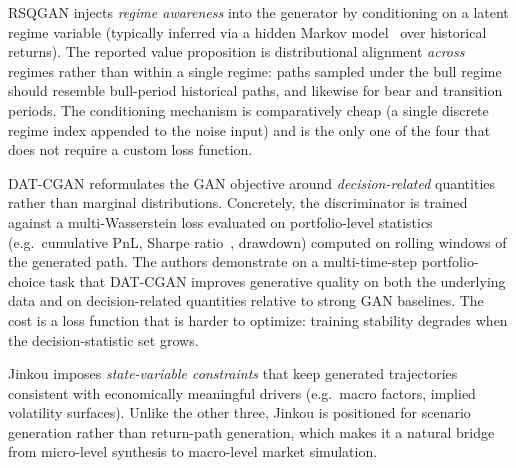 \documentclass[11pt,a4paper]{article}
\begin{document}
RSQGAN \citep{RSQGAN} injects \emph{regime awareness} into the generator by conditioning on a latent regime variable (typically inferred via a hidden Markov model~\citep{rabiner1989tutorial,hamilton1989new} over historical returns). The reported value proposition is distributional alignment \emph{across} regimes rather than within a single regime: paths sampled under the bull regime should resemble bull-period historical paths, and likewise for bear and transition periods. The conditioning mechanism is comparatively cheap (a single discrete regime index appended to the noise input) and is the only one of the four that does not require a custom loss function.

DAT-CGAN \citep{DAT-CGAN} reformulates the GAN objective around \emph{decision-related} quantities rather than marginal distributions. Concretely, the discriminator is trained against a multi-Wasserstein loss evaluated on portfolio-level statistics (e.g.\ cumulative PnL, Sharpe ratio~\citep{sharpe1994sharpe}, drawdown) computed on rolling windows of the generated path. The authors demonstrate on a multi-time-step portfolio-choice task that DAT-CGAN improves generative quality on both the underlying data and on decision-related quantities relative to strong GAN baselines. The cost is a loss function that is harder to optimize: training stability degrades when the decision-statistic set grows.

Jinkou \citep{Jinkou} imposes \emph{state-variable constraints} that keep generated trajectories consistent with economically meaningful drivers (e.g.\ macro factors, implied volatility surfaces). Unlike the other three, Jinkou is positioned for scenario generation rather than return-path generation, which makes it a natural bridge from micro-level synthesis to macro-level market simulation.
\end{document}
